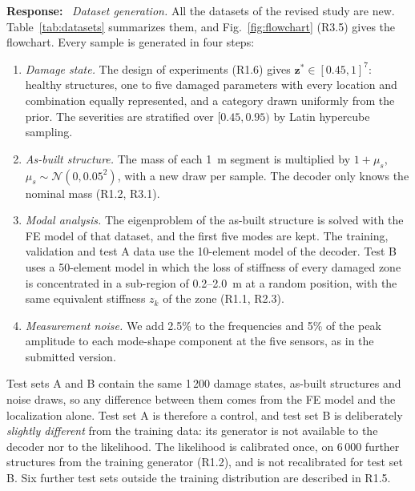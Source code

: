 \documentclass[11pt]{article}
\newenvironment{response}{\par\smallskip\noindent\color{resp}\textbf{Response:}\ }{\par}
\newcommand{\z}{\mathbf{z}}
\begin{document}
\begin{response}
\textit{Dataset generation.} All the datasets of the revised study are new. Table~\ref{tab:datasets} summarizes them, and Fig.~\ref{fig:flowchart} (R3.5) gives the flowchart. Every sample is
generated in four steps:
\begin{enumerate}[leftmargin=*,label=(\arabic*)]
\item \emph{Damage state.} The design of experiments (R1.6) gives $\z^*\in[0.45,1]^7$: healthy structures, one to five damaged
parameters with every location and combination equally represented, and a category drawn uniformly from the prior. The
severities are stratified over $[0.45,0.95)$ by Latin hypercube sampling.
\item \emph{As-built structure.} The mass of each 1~m segment is multiplied by $1+\mu_s$, $\mu_s\sim\mathcal{N}(0,0.05^2)$, with
a new draw per sample. The decoder only knows the nominal mass (R1.2, R3.1).
\item \emph{Modal analysis.} The eigenproblem of the as-built structure is solved with the FE model of that dataset, and the first
five modes are kept. The training, validation and test A data use the 10-element model of the decoder. Test B uses a 50-element
model in which the loss of stiffness of every damaged zone is concentrated in a sub-region of 0.2--2.0~m at a random position,
with the same equivalent stiffness $z_k$ of the zone (R1.1, R2.3).
\item \emph{Measurement noise.} We add 2.5\% to the frequencies and 5\% of the peak amplitude to each mode-shape component at the five
sensors, as in the submitted version.
\end{enumerate}
Test sets A and B contain the same 1\,200 damage states, as-built structures and noise draws, so any difference between them comes
from the FE model and the localization alone. Test set A is therefore a control, and test set B is deliberately \emph{slightly different}
from the training data: its generator is not available to the decoder nor to the likelihood. The likelihood is calibrated once,
on 6\,000 further structures from the training generator (R1.2), and is not recalibrated for test set B. Six further test sets
outside the training distribution are described in R1.5.


\end{response}
\end{document}
